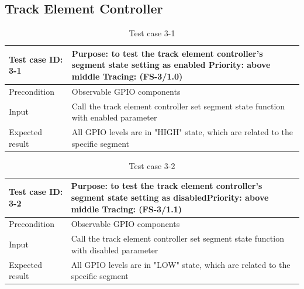 \subsection{Track Element Controller}

\begin{table}[H]
	\caption{Test case 3-1}
	\label{table:TCase-FS3-1}
	\begin{center}
		\renewcommand{\arraystretch}{1.8}
		\begin{tabu} 
			to 0.9 \textwidth
			{  X[0.4, c] X[c] }
			\toprule
			Test case ID: 3-1 & Purpose: to test the track element controller's segment state setting as enabled \newline Priority: above middle \newline Tracing: (FS-3/1.0) \\ \midrule
			Precondition      & Observable GPIO components                                                                                                                    \\
			Input             & Call the track element controller set segment state function with enabled parameter                                                           \\
			Expected result   & All GPIO levels are in "HIGH" state, which are related to the specific segment                                                                \\ \bottomrule
		\end{tabu}
	\end{center}
\end{table}

\begin{table}[H]
	\caption{Test case 3-2}
	\label{table:TCase-FS3-2}
	\begin{center}
		\renewcommand{\arraystretch}{1.8}
		\begin{tabu} 
			to 0.9 \textwidth
			{  X[0.4, c] X[c] }
			\toprule
			Test case ID: 3-2 & Purpose: to test the track element controller's segment state setting as disabled\newline Priority: above middle \newline Tracing: (FS-3/1.1) \\ \midrule
			Precondition      & Observable GPIO components                                                                                                                    \\
			Input             & Call the track element controller set segment state function with disabled parameter                                                          \\
			Expected result   & All GPIO levels are in "LOW" state, which are related to the specific segment                                                                 \\ \bottomrule
		\end{tabu}
	\end{center}
\end{table} 

